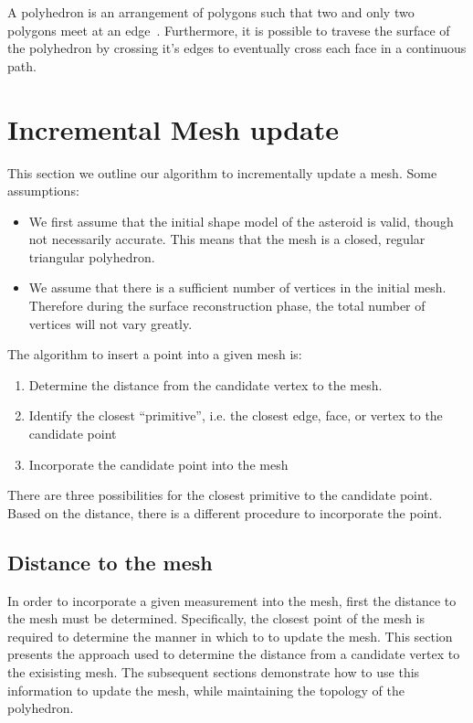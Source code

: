 A \gls{polyhedron} is an arrangement of \glspl{polygon} such that two and only two \glspl{polygon} meet at an edge~\cite{mortenson1997}.
Furthermore, it is possible to travese the surface of the \gls{polyhedron} by crossing it's edges to eventually cross each face in a continuous path.

\section{Incremental Mesh update}

This section we outline our algorithm to incrementally update a mesh. 
Some assumptions:

\begin{itemize}
    \item We first assume that the initial shape model of the asteroid is valid, though not necessarily accurate.
        This means that the mesh is a closed, regular triangular polyhedron.
    \item We assume that there is a sufficient number of vertices in the initial mesh. 
        Therefore during the surface reconstruction phase, the total number of vertices will not vary greatly.
\end{itemize}

The algorithm to insert a point into a given mesh is:

\begin{enumerate}
    \item Determine the distance from the candidate vertex to the mesh.
    \item Identify the closest ``primitive'', i.e. the closest edge, face, or vertex to the candidate point
    \item Incorporate the candidate point into the mesh
\end{enumerate}

There are three possibilities for the closest primitive to the candidate point. 
Based on the distance, there is a different procedure to incorporate the point.

\subsection{Distance to the mesh}

In order to incorporate a given measurement into the mesh, first the distance to the mesh must be determined.
Specifically, the closest point of the mesh is required to determine the manner in which to to update the mesh.
This section presents the approach used to determine the distance from a candidate vertex to the exisisting mesh. 
The subsequent sections demonstrate how to use this information to update the mesh, while maintaining the topology of the polyhedron.

